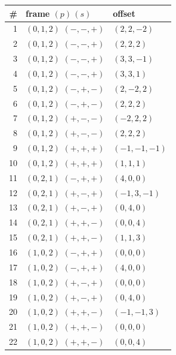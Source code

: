 \begin{tabular}{rll}
\toprule
\# & frame $(p)\,(s)$ & offset \\
\midrule
1 & $(0,1,2)$ $(-,-,+)$ & $(2,2,-2)$ \\
2 & $(0,1,2)$ $(-,-,+)$ & $(2,2,2)$ \\
3 & $(0,1,2)$ $(-,-,+)$ & $(3,3,-1)$ \\
4 & $(0,1,2)$ $(-,-,+)$ & $(3,3,1)$ \\
5 & $(0,1,2)$ $(-,+,-)$ & $(2,-2,2)$ \\
6 & $(0,1,2)$ $(-,+,-)$ & $(2,2,2)$ \\
7 & $(0,1,2)$ $(+,-,-)$ & $(-2,2,2)$ \\
8 & $(0,1,2)$ $(+,-,-)$ & $(2,2,2)$ \\
9 & $(0,1,2)$ $(+,+,+)$ & $(-1,-1,-1)$ \\
10 & $(0,1,2)$ $(+,+,+)$ & $(1,1,1)$ \\
11 & $(0,2,1)$ $(-,+,+)$ & $(4,0,0)$ \\
12 & $(0,2,1)$ $(+,-,+)$ & $(-1,3,-1)$ \\
13 & $(0,2,1)$ $(+,-,+)$ & $(0,4,0)$ \\
14 & $(0,2,1)$ $(+,+,-)$ & $(0,0,4)$ \\
15 & $(0,2,1)$ $(+,+,-)$ & $(1,1,3)$ \\
16 & $(1,0,2)$ $(-,+,+)$ & $(0,0,0)$ \\
17 & $(1,0,2)$ $(-,+,+)$ & $(4,0,0)$ \\
18 & $(1,0,2)$ $(+,-,+)$ & $(0,0,0)$ \\
19 & $(1,0,2)$ $(+,-,+)$ & $(0,4,0)$ \\
20 & $(1,0,2)$ $(+,+,-)$ & $(-1,-1,3)$ \\
21 & $(1,0,2)$ $(+,+,-)$ & $(0,0,0)$ \\
22 & $(1,0,2)$ $(+,+,-)$ & $(0,0,4)$ \\
\bottomrule
\end{tabular}\hfill
